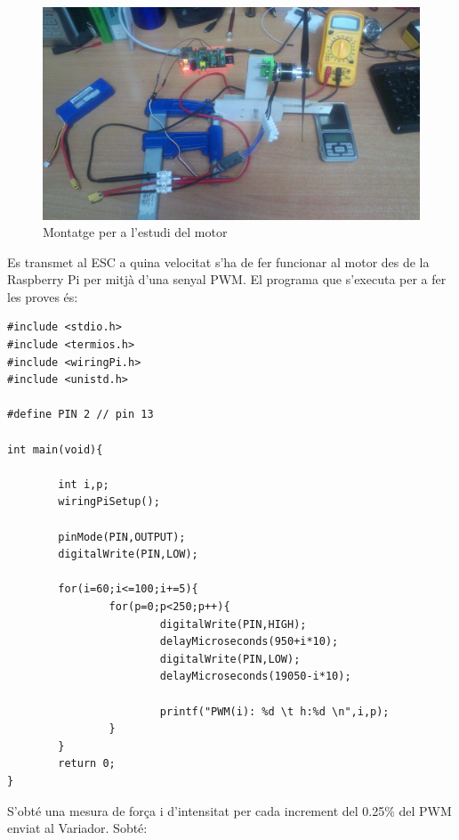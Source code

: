 \documentclass[twoside]{article}
\begin{document}
\begin{figure}[h!]
\begin{center}
\includegraphics[scale=0.09]{images/montaje.jpg}
\caption{Montatge per a l'estudi del motor}
\end{center}
\end{figure}

Es transmet al ESC a quina velocitat s'ha de fer funcionar al motor des de la Raspberry Pi per mitjà d'una senyal PWM. El programa que s'executa per a fer les proves és:

\begin{verbatim}
#include <stdio.h>
#include <termios.h>
#include <wiringPi.h>
#include <unistd.h>

#define PIN 2 // pin 13

int main(void){

        int i,p;
        wiringPiSetup();

        pinMode(PIN,OUTPUT);
        digitalWrite(PIN,LOW);

        for(i=60;i<=100;i+=5){
                for(p=0;p<250;p++){
                        digitalWrite(PIN,HIGH);
                        delayMicroseconds(950+i*10);
                        digitalWrite(PIN,LOW);
                        delayMicroseconds(19050-i*10);

                        printf("PWM(i): %d \t h:%d \n",i,p);
                }
        }
        return 0;
}
\end{verbatim}

S'obté una mesura de força i d'intensitat per cada increment del 0.25\% del PWM enviat al Variador. Sobté:
\end{document}
